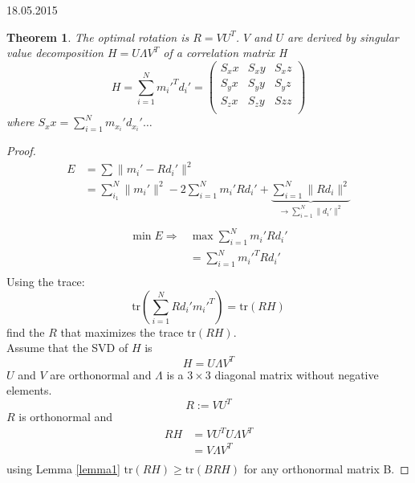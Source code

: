 \documentclass[a4paper,10pt,ngerman]{article}
\newtheorem{theorem}{Theorem}
\newcommand{\trace}[1]{\text{tr}\left(#1\right)}
\begin{document}
\begin{section}{18.05.2015}
 
 \begin{theorem}
  The optimal rotation is $R=VU^T$. $V$ and $U$ are derived by singular value decomposition $H = U \Lambda V^T$ of a correlation matrix H 
  \[ H = \sum_{i=1}^N m_i'^T d_i' = \begin{pmatrix}
                                     S_xx & S_xy & S_xz \\
                                     S_yx & S_yy & S_yz \\
                                     S_zx & S_zy & Szz\\
                                    \end{pmatrix} \]
where $S_xx = \sum_{i=1}^N m_{x_i}' d_{x_i}' \dots$
 \end{theorem}
 \begin{proof}
  \begin{align*}
  E &= \sum \| m_i' - Rd_i' \|^2\\
  &= \sum_{i_1}^N \| m_i' \|^2 - 2 \sum_{i=1}^N m_i'Rd_i' + \underbrace{\sum_{i=1}^N \| Rd_i \|^2}_{\rightarrow \sum_{i=1}^N \|d_i'\|^2} \\   
  \end{align*}
  \begin{align*}
  \min E \Rightarrow &\max \sum_{i=1}^N m_i' Rd_i' \\
  &= \sum_{i=1}^N m_i'^T Rd_i'\\
  \end{align*}
  Using the trace:
  \[ \trace{\sum_{i=1}^N Rd_i' m_i'^T } = \trace{RH} \]
  find the $R$ that maximizes the trace $\trace{RH}$.\\
  Assume that the SVD of $H$ is
  \[ H = U \Lambda V^T  \]
  $U$ and $V$ are orthonormal and $\Lambda$ is a $3\times 3$ diagonal matrix without negative elements.
  \[ R := VU^T\]
  $R$ is orthonormal and
  \begin{align*}
   RH &=  VU^TU\Lambda V^T \\ &= V \Lambda V^T\\
  \end{align*}
  using Lemma \ref{lemma1} $\trace{RH} \geq \trace{BRH}$ for any orthonormal matrix B.
 \end{proof}
\end{section}
\end{document}
